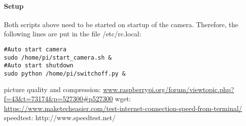 \paragraph{Setup}

Both scripts above need to be started on startup of the camera. Therefore, the following lines are put in the file /etc/rc.local:
\begin{center}
\begin{minipage}{0.9\linewidth}
\begin{lstlisting}[caption=$/etc/rc.local$, label=local, frame=none]
#Auto start camera
sudo /home/pi/start_camera.sh &
#Auto start shutdown
sudo python /home/pi/switchoff.py &
\end{lstlisting}
\end{minipage}
\end{center}


picture quality and compression:
\url{www.raspberrypi.org/forum/viewtopic.php?f=43&t=73174&p=527300#p527300}
wget:
\url{https://www.maketecheasier.com/test-internet-connection-speed-from-terminal/}
speedtest:
http://www.speedtest.net/

